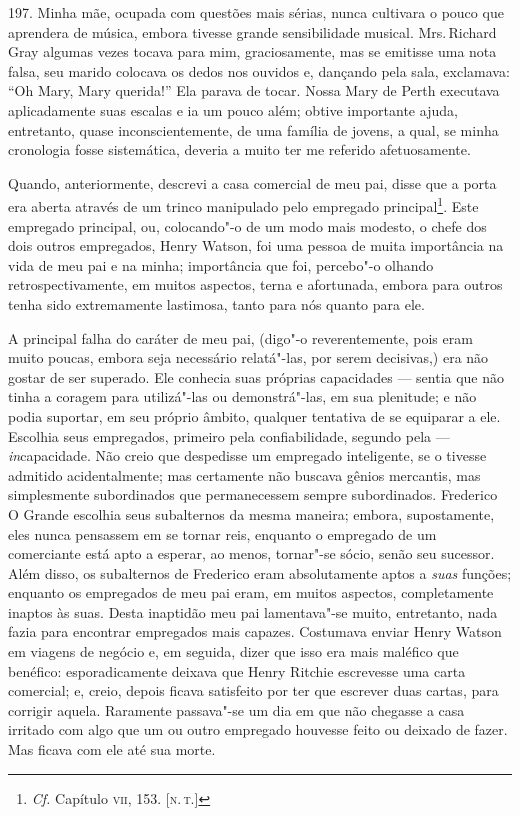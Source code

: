 197. Minha mãe, ocupada com questões mais sérias, nunca cultivara o
pouco que aprendera de música, embora tivesse grande sensibilidade
musical. Mrs.\,Richard Gray algumas vezes tocava para mim, graciosamente,
mas se emitisse uma nota falsa, seu marido colocava os dedos nos ouvidos
e, dançando pela sala, exclamava: ``Oh Mary, Mary querida!'' Ela parava
de tocar. Nossa Mary de Perth executava aplicadamente suas escalas e ia
um pouco além; obtive importante ajuda, entretanto, quase
inconscientemente, de uma família de jovens, a qual, se minha cronologia
fosse sistemática, deveria a muito ter me referido afetuosamente.

Quando, anteriormente, descrevi a casa comercial de meu pai, disse que a
porta era aberta através de um trinco manipulado pelo empregado
principal\footnote{\emph{Cf.} Capítulo \textsc{vii}, 153. {[}\textsc{n.\,t.}{]}}. Este
empregado principal, ou, colocando"-o de um modo mais modesto, o chefe
dos dois outros empregados, Henry Watson, foi uma pessoa de muita
importância na vida de meu pai e na minha; importância que foi,
percebo"-o olhando retrospectivamente, em muitos aspectos, terna e
afortunada, embora para outros tenha sido extremamente lastimosa, tanto
para nós quanto para ele.

A principal falha do caráter de meu pai, (digo"-o reverentemente, pois
eram muito poucas, embora seja necessário relatá"-las, por serem
decisivas,) era não gostar de ser superado. Ele conhecia suas próprias
capacidades --- sentia que não tinha a coragem para utilizá"-las ou
demonstrá"-las, em sua plenitude; e não podia suportar, em seu próprio
âmbito, qualquer tentativa de se equiparar a ele. Escolhia seus
empregados, primeiro pela confiabilidade, segundo pela ---
\emph{in}capacidade. Não creio que despedisse um empregado inteligente,
se o tivesse admitido acidentalmente; mas certamente não buscava gênios
mercantis, mas simplesmente subordinados que permanecessem sempre
subordinados. Frederico O Grande escolhia seus subalternos da mesma
maneira; embora, supostamente, eles nunca pensassem em se tornar reis,
enquanto o empregado de um comerciante está apto a esperar, ao menos,
tornar"-se sócio, senão seu sucessor. Além disso, os subalternos de
Frederico eram absolutamente aptos a \emph{suas} funções; enquanto os
empregados de meu pai eram, em muitos aspectos, completamente inaptos às
suas. Desta inaptidão meu pai lamentava"-se muito, entretanto, nada fazia
para encontrar empregados mais capazes. Costumava enviar Henry Watson em
viagens de negócio e, em seguida, dizer que isso era mais maléfico que
benéfico: esporadicamente deixava que Henry Ritchie escrevesse uma carta
comercial; e, creio, depois ficava satisfeito por ter que escrever duas
cartas, para corrigir aquela. Raramente passava"-se um dia em que não
chegasse a casa irritado com algo que um ou outro empregado houvesse
feito ou deixado de fazer. Mas ficava com ele até sua morte.


